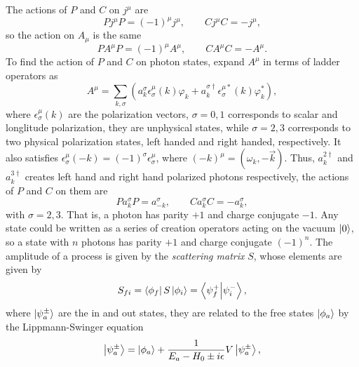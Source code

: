 \begin{problembody}
    \item The actions of $P$ and $C$ on $j^\mu$ are
    \begin{equation*}
        Pj^\mu P = (-1)^\mu j^\mu, \qquad Cj^\mu C = -j^\mu,
    \end{equation*}
    so the action on $A_\mu$ is the same
    \begin{equation*}
        PA^\mu P = (-1)^\mu A^\mu, \qquad CA^\mu C = -A^\mu.
    \end{equation*}
    To find the action of $P$ and $C$ on photon states, expand $A^\mu$ in terms of ladder operators as
    \begin{equation*}
        A^\mu = \sum_{k, \sigma} \left(
            a_k^\sigma\epsilon_\sigma^\mu(k)\varphi_k
            + a_k^{\sigma\dagger}\epsilon_\sigma^{\mu\ast}(k)\varphi_k^\ast
        \right),
    \end{equation*}
    where $\epsilon_\sigma^\mu(k)$ are the polarization vectors, $\sigma = 0, 1$ corresponds to scalar 
    and longlitude polarization, they are unphysical states, while $\sigma = 2, 3$ corresponds to 
    two physical polarization states, left handed and right handed, respectively. It also satisfies 
    $\epsilon_\sigma^\mu(-k) = (-1)^\sigma\epsilon_\sigma^\mu$, where $(-k)^\mu = (\omega_k, -\vec{k})$.
    Thus, $a_k^{2\dagger}$ and $a_k^{3\dagger}$ creates left hand and right hand polarized photons 
    respectively, the actions of $P$ and $C$ on them are
    \begin{equation*}
        P a_k^\sigma P = a_{-k}^\sigma, \qquad C a_k^\sigma C = -a_k^\sigma,
    \end{equation*}
    with $\sigma = 2, 3$. That is, a photon has parity $+1$ and charge conjugate $-1$. Any state could be 
    written as a series of creation operators acting on the vacuum $\left|0\right\rangle$, so a state with $n$ photons has
    parity $+1$ and charge conjugate $(-1)^n$. The amplitude of a process is given by the \textit{scattering matrix} $S$,
    whose elements are given by
    \begin{equation}\label{equ:cp3:s_matrix_def}
        S_{fi} = \left\langle \phi_f\right|S\left|\phi_i\right\rangle = \left\langle \psi^+_f \middle| \psi^-_i \right\rangle,
    \end{equation}
    where $\left|\psi^\pm_a\right\rangle$ are the in and out states, they are related to the free states $\left|\phi_a\right\rangle$ by
    the Lippmann-Swinger equation
    \begin{equation*}
        \left|\psi^\pm_a\right\rangle = \left|\phi_a\right\rangle 
        + \frac{1}{E_a - H_0 \pm i\epsilon} V \left|\psi^\pm_a\right\rangle,
    \end{equation*}

\end{problembody}
